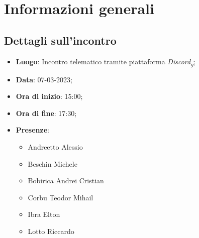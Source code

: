 \section{Informazioni generali}

\subsection{Dettagli sull'incontro}
\begin{itemize}
\item \textbf{Luogo}: Incontro telematico tramite piattaforma \textit{Discord\textsubscript{g}};
\item \textbf{Data}: 07-03-2023;
\item \textbf{Ora di inizio}: 15:00;
\item \textbf{Ora di fine}: 17:30;
\item \textbf{Presenze}: 
\begin{itemize}
	\item Andreetto Alessio
    \item Beschin Michele
    \item Bobirica Andrei Cristian
    \item Corbu Teodor Mihail
    \item Ibra Elton
    \item Lotto Riccardo
\end{itemize}
\end{itemize}



